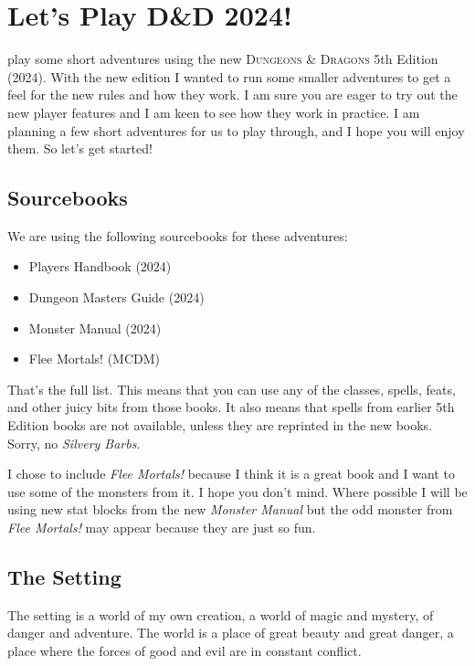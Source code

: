 \documentclass[10pt,a4paper,twoside,twocolumn,openany,nodeprecatedcode]{dndbook}
\date{}
\begin{document}
\frontmatter
\mainmatter
\chapter*{Let's Play D\&D 2024!}

 play some short adventures using the new \textsc{Dungeons \& Dragons} 5th Edition (2024). With the new edition I wanted to run some smaller adventures to get a feel for the new rules and how they work. I am sure you are eager to try out the new player features and I am keen to see how they work in practice. I am planning a few short adventures for us to play through, and I hope you will enjoy them. So let's get started!

\section{Sourcebooks}

We are using the following sourcebooks for these adventures:

\begin{itemize}
    \item Players Handbook (2024)
    \item Dungeon Masters Guide (2024)
    \item Monster Manual (2024)
    \item Flee Mortals! (MCDM)
\end{itemize}

That's the full list. This means that you can use any of the classes, spells, feats, and other juicy bits from those books. It also means that spells from earlier 5th Edition books are not available, unless they are reprinted in the new books. Sorry, no \textit{Silvery Barbs}.

I chose to include \textit{Flee Mortals!} because I think it is a great book and I want to use some of the monsters from it. I hope you don't mind. Where possible I will be using new stat blocks from the new \textit{Monster Manual} but the odd monster from \textit{Flee Mortals!} may appear because they are just so fun.

\section{The Setting}
The setting is a world of my own creation, a world of magic and mystery, of danger and adventure. The world is a place of great beauty and great danger, a place where the forces of good and evil are in constant conflict.
\end{document}
